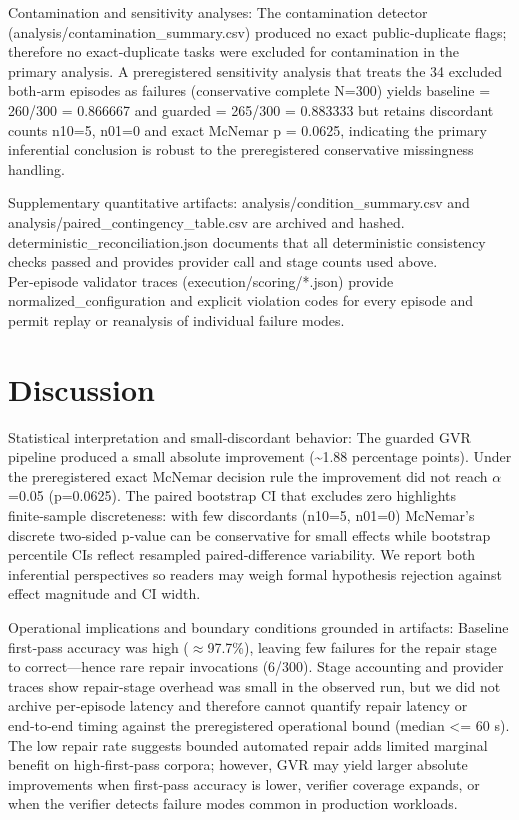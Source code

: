 \documentclass[conference]{IEEEtran}
\begin{document}
Contamination and sensitivity analyses: The contamination detector (analysis/contamination\_summary.csv) produced no exact public‑duplicate flags; therefore no exact‑duplicate tasks were excluded for contamination in the primary analysis. A preregistered sensitivity analysis that treats the 34 excluded both‑arm episodes as failures (conservative complete N=300) yields baseline = 260/300 = 0.866667 and guarded = 265/300 = 0.883333 but retains discordant counts n10=5, n01=0 and exact McNemar p = 0.0625, indicating the primary inferential conclusion is robust to the preregistered conservative missingness handling.

Supplementary quantitative artifacts: analysis/condition\_summary.csv and analysis/paired\_contingency\_table.csv are archived and hashed. deterministic\_reconciliation.json documents that all deterministic consistency checks passed and provides provider call and stage counts used above. Per‑episode validator traces (execution/scoring/*.json) provide normalized\_configuration and explicit violation codes for every episode and permit replay or reanalysis of individual failure modes.

\section{Discussion}
Statistical interpretation and small‑discordant behavior: The guarded GVR pipeline produced a small absolute improvement (\textasciitilde{}1.88 percentage points). Under the preregistered exact McNemar decision rule the improvement did not reach \ensuremath{\alpha}=0.05 (p=0.0625). The paired bootstrap CI that excludes zero highlights finite‑sample discreteness: with few discordants (n10=5, n01=0) McNemar's discrete two‑sided p‑value can be conservative for small effects while bootstrap percentile CIs reflect resampled paired‑difference variability. We report both inferential perspectives so readers may weigh formal hypothesis rejection against effect magnitude and CI width.

Operational implications and boundary conditions grounded in artifacts: Baseline first‑pass accuracy was high (\ensuremath{\approx}97.7\%), leaving few failures for the repair stage to correct---hence rare repair invocations (6/300). Stage accounting and provider traces show repair-stage overhead was small in the observed run, but we did not archive per‑episode latency and therefore cannot quantify repair latency or end‑to‑end timing against the preregistered operational bound (median <= 60 s). The low repair rate suggests bounded automated repair adds limited marginal benefit on high‑first‑pass corpora; however, GVR may yield larger absolute improvements when first‑pass accuracy is lower, verifier coverage expands, or when the verifier detects failure modes common in production workloads.
\end{document}
